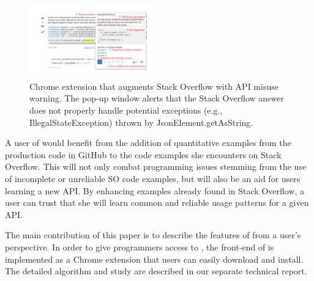 \begin{figure}
\centering
\includegraphics[width=0.5\textwidth]{soap-v2.pdf}
  \vspace{.1in}
  \caption{{\tool} Chrome extension that augments Stack Overflow with API misuse warning. The pop-up window alerts that the Stack Overflow answer does not properly handle potential exceptions (e.g., {\ttt IllegalStateException}) thrown by {\ttt JsonElement.getAsString}.\protect\footnotemark}
  \label{fig:screenshot}
\end{figure}


A user of {\tool} would benefit from the addition of quantitative examples from the production code in GitHub  to the code examples she encounters on Stack Overflow. This will not only combat programming issues stemming from the use of incomplete or unreliable SO code examples, but will also be an aid for users learning a new API. By enhancing examples already found in Stack Overflow, a user can trust that she will learn common and reliable usage patterns for a given API.

The main contribution of this paper is to describe the features of {\tool} from a user's perspective. In order to give programmers access to {\tool}, the front-end of {\tool} is implemented as a Chrome extension that users can easily download and install. The detailed algorithm and study are described in our separate technical report.

%
